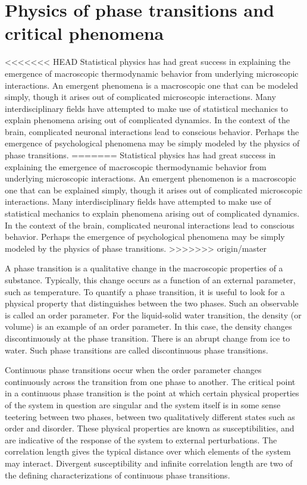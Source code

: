 \documentclass[12pt]{article}
\begin{document}
\section*{Physics of phase transitions and critical phenomena}

<<<<<<< HEAD
Statistical physics has had great success in explaining the emergence of macroscopic thermodynamic behavior from underlying microscopic interactions. An emergent phenomena is a macroscopic one that can be modeled simply, though it arises out of complicated microscopic interactions. Many interdisciplinary fields have attempted to make use of statistical mechanics to explain phenomena arising out of complicated dynamics. In the context of the brain, complicated neuronal interactions lead to conscious behavior. Perhaps the emergence of psychological phenomena may be simply modeled by the physics of phase transitions.
=======
Statistical physics has had great success in explaining the emergence of macroscopic thermodynamic behavior from underlying microscopic interactions. An emergent phenomenon is a macroscopic one that can be explained simply, though it arises out of complicated microscopic interactions. Many interdisciplinary fields have attempted to make use of statistical mechanics to explain phenomena arising out of complicated dynamics. In the context of the brain, complicated neuronal interactions lead to conscious behavior. Perhaps the emergence of psychological phenomena may be simply modeled by the physics of phase transitions.
>>>>>>> origin/master

A phase transition is a qualitative change in the macroscopic properties of a substance. Typically, this change occurs as a function of an external parameter, such as temperature. To quantify a phase transition, it is useful to look for a physical property that distinguishes between the two phases. Such an observable is called an order parameter. For the liquid-solid water transition, the density (or volume) is an example of an order parameter. In this case, the density changes discontinuously at the phase transition. There is an abrupt change from ice to water. Such phase transitions are called discontinuous phase transitions.

Continuous phase transitions occur when the order parameter changes continuously across the transition from one phase to another. The critical point in a continuous phase transition is the point at which certain physical properties of the system in question are singular and the system itself is in some sense teetering between two phases, between two qualitatively different states such as order and disorder. These physical properties are known as susceptibilities, and are indicative of the response of the system to external perturbations. The correlation length gives the typical distance over which elements of the system may interact. Divergent susceptibility and infinite correlation length are two of the defining characterizations of continuous phase transitions.
\end{document}
